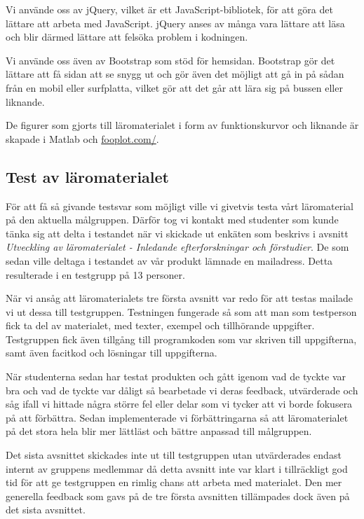\documentclass[]{article}
\begin{document}
Vi använde oss av jQuery, vilket är ett JavaScript-bibliotek, för att göra det lättare att arbeta med JavaScript. jQuery
anses av många vara lättare att läsa och blir därmed lättare att felsöka problem i kodningen.

Vi använde oss även av Bootstrap som stöd för hemsidan. Bootstrap gör det lättare att få sidan att se snygg ut och gör
även det möjligt att gå in på sådan från en mobil eller surfplatta, vilket gör att det går att lära sig på bussen eller
liknande.

De figurer som gjorts till läromaterialet i form av funktionskurvor och liknande är skapade i
Matlab och \url{fooplot.com/}.


\subsection{Test av läromaterialet}

För att få så givande testsvar som möjligt ville vi givetvis testa vårt läromaterial på den aktuella målgruppen.  Därför
tog vi kontakt med studenter som kunde tänka sig att delta i testandet när vi skickade ut enkäten som beskrivs i avsnitt
\textit{Utveckling av läromaterialet - Inledande efterforskningar och förstudier}. De som sedan ville deltaga i
testandet av vår produkt lämnade en mailadress. Detta resulterade i en testgrupp på 13 personer.

När vi ansåg att läromaterialets tre första avsnitt var redo för att testas mailade vi ut dessa till testgruppen.
Testningen fungerade så som att man som testperson fick ta del av materialet, med texter, exempel och tillhörande
uppgifter. Testgruppen fick även tillgång till programkoden som var skriven till uppgifterna, samt även facitkod och
lösningar till uppgifterna.

När studenterna sedan har testat produkten och gått igenom vad de tyckte var bra och vad de tyckte var dåligt så
bearbetade vi deras feedback, utvärderade och såg ifall vi hittade några större fel eller delar som vi tycker att vi
borde fokusera på att förbättra. Sedan implementerade vi förbättringarna så att läromaterialet på det stora hela blir
mer lättläst och bättre anpassad till målgruppen.

Det sista avsnittet skickades inte ut till testgruppen utan utvärderades endast internt av gruppens medlemmar då detta
avsnitt inte var klart i tillräckligt god tid för att ge testgruppen en rimlig chans att arbeta med materialet. Den mer
generella feedback som gavs på de tre första avsnitten tillämpades dock även på det sista avsnittet.
\end{document}
